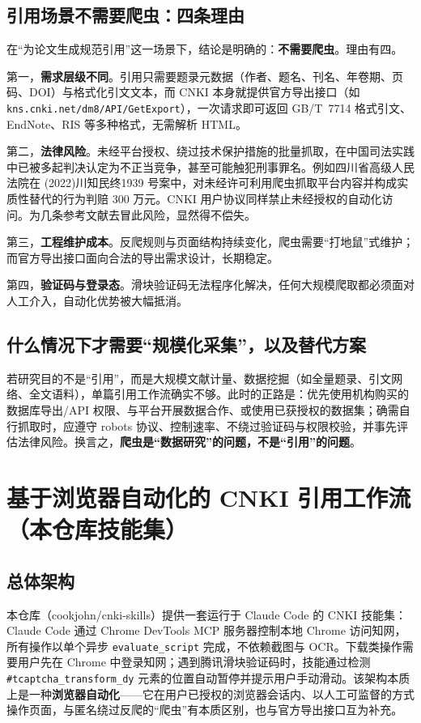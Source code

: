 \documentclass[UTF8, zihao=-4, fontset=fandol]{ctexart}
\begin{document}
\subsection{引用场景不需要爬虫：四条理由}

在“为论文生成规范引用”这一场景下，结论是明确的：\textbf{不需要爬虫}。理由有四。

第一，\textbf{需求层级不同}。引用只需要题录元数据（作者、题名、刊名、年卷期、页码、DOI）与格式化引文文本，而 CNKI 本身就提供官方导出接口（如 \texttt{kns.cnki.net/dm8/API/GetExport}），一次请求即可返回 GB/T~7714 格式引文、EndNote、RIS 等多种格式，无需解析 HTML。

第二，\textbf{法律风险}。未经平台授权、绕过技术保护措施的批量抓取，在中国司法实践中已被多起判决认定为不正当竞争，甚至可能触犯刑事罪名。例如四川省高级人民法院在 (2022)川知民终1939 号案中，对未经许可利用爬虫抓取平台内容并构成实质性替代的行为判赔 300 万元\cite{scraping_case}。CNKI 用户协议同样禁止未经授权的自动化访问。为几条参考文献去冒此风险，显然得不偿失。

第三，\textbf{工程维护成本}。反爬规则与页面结构持续变化，爬虫需要“打地鼠”式维护；而官方导出接口面向合法的导出需求设计，长期稳定。

第四，\textbf{验证码与登录态}。滑块验证码无法程序化解决\cite{cnki_skills}，任何大规模爬取都必须面对人工介入，自动化优势被大幅抵消。

\subsection{什么情况下才需要“规模化采集”，以及替代方案}

若研究目的不是“引用”，而是大规模文献计量、数据挖掘（如全量题录、引文网络、全文语料），单篇引用工作流确实不够。此时的正路是：优先使用机构购买的数据库导出/API 权限、与平台开展数据合作、或使用已获授权的数据集；确需自行抓取时，应遵守 robots 协议、控制速率、不绕过验证码与权限校验，并事先评估法律风险。换言之，\textbf{爬虫是“数据研究”的问题，不是“引用”的问题}。

\section{基于浏览器自动化的 CNKI 引用工作流（本仓库技能集）}

\subsection{总体架构}

本仓库（cookjohn/cnki-skills）提供一套运行于 Claude Code 的 CNKI 技能集：Claude Code 通过 Chrome DevTools MCP 服务器控制本地 Chrome 访问知网，所有操作以单个异步 \texttt{evaluate\_script} 完成，不依赖截图与 OCR\cite{cnki_skills}。下载类操作需要用户先在 Chrome 中登录知网；遇到腾讯滑块验证码时，技能通过检测 \texttt{\#tcaptcha\_transform\_dy} 元素的位置自动暂停并提示用户手动滑动。该架构本质上是一种\textbf{浏览器自动化}——它在用户已授权的浏览器会话内、以人工可监督的方式操作页面，与匿名绕过反爬的“爬虫”有本质区别，也与官方导出接口互为补充。
\end{document}
